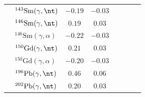 {\begin{longtable}{llcc llcc}
$ $ & $^{143}\mathrm{Sm}(\gamma,\nt)$ & $-0.19$ & $-0.03$ & $ $ & $ $ &  &  \\ 
$ $ & $^{146}\mathrm{Sm}(\gamma,\nt)$ & $0.19$ & $0.03$ & $ $ & $ $ &  &  \\ 
$ $ & $^{146}\mathrm{Sm}(\gamma,\alpha)$ & $-0.22$ & $-0.03$ & $ $ & $ $ &  &  \\ 
$ $ & $^{150}\mathrm{Gd}(\gamma,\nt)$ & $0.21$ & $0.03$ & $ $ & $ $ &  &  \\ 
$ $ & $^{150}\mathrm{Gd}(\gamma,\alpha)$ & $-0.20$ & $-0.03$ & $ $ & $ $ &  &  \\ 
$ $ & $^{196}\mathrm{Pb}(\gamma,\nt)$ & $0.46$ & $0.06$ & $ $ & $ $ &  &  \\ 
$ $ & $^{202}\mathrm{Pb}(\gamma,\nt)$ & $0.20$ & $0.03$ & $ $ & $ $ &  &  \\ 
\end{longtable}
}

